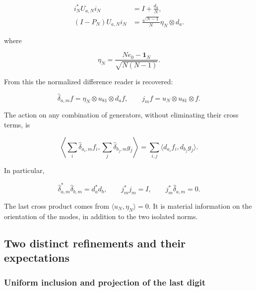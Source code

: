 \begin{equation}
\begin{aligned}
i_N^*U_{a,N}i_N&=I+\frac{d_a}{N},\\
(I-P_N)U_{a,N}i_N
&=\frac{\sqrt{N-1}}{N}\eta_N\otimes d_a.
\end{aligned}
\label{viii:gamma-add-display-3}
\end{equation}

where

\begin{equation}
\eta_N=\frac{Ne_0-\mathbf1_N}{\sqrt{N(N-1)}}.
\label{viii:gamma-add-display-4}
\end{equation}

From this the normalized difference reader is recovered:

\begin{equation}
\widehat\delta_{a,m}f=\eta_N\otimes u_{81}\otimes d_af,
\qquad
j_mf=u_N\otimes u_{81}\otimes f.
\label{viii:gamma-add-display-5}
\end{equation}

The action on any combination of generators, without eliminating their cross terms, is

\begin{equation}
\left\langle\sum_i\widehat\delta_{a_i,m}f_i,
                  \sum_j\widehat\delta_{b_j,m}g_j\right\rangle
=\sum_{i,j}\langle d_{a_i}f_i,d_{b_j}g_j\rangle.
\label{viii:gamma-add-display-6}
\end{equation}

In particular,

\begin{equation}
\widehat\delta_{a,m}^*\widehat\delta_{b,m}=d_a^*d_b,\qquad
j_m^*j_m=I,\qquad
j_m^*\widehat\delta_{a,m}=0.
\label{viii:gamma-add-eq-1}
\end{equation}

The last cross product comes from \(\langle u_N,\eta_N\rangle=0\). It is material information on the orientation of the modes, in addition to the two isolated norms.

\subsection{Two distinct refinements and their expectations}
\label{viii:gamma-add-sub-108}

\subsubsection{Uniform inclusion and projection of the last digit}
\label{viii:gamma-add-sub-110}

